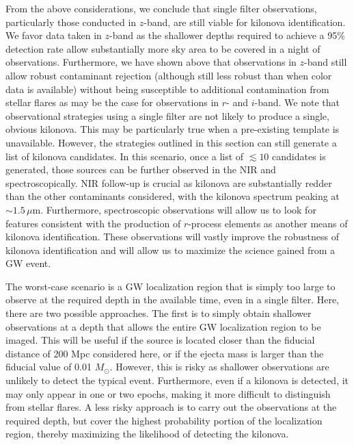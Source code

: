 From the above considerations, we conclude that single filter observations, particularly those conducted in $z$-band, are still viable for kilonova identification. We favor data taken in $z$-band as the shallower depths required to achieve a 95\% detection rate allow substantially more sky area to be covered in a night of observations.  Furthermore, we have shown above that observations in $z$-band still allow robust contaminant rejection (although still less robust than when color data is available) without being susceptible to additional contamination from stellar flares as may be the case for observations in $r$- and $i$-band. We note that observational strategies using a single filter are not likely to  produce a single, obvious kilonova. This may be particularly true when a pre-existing template is unavailable. However, the strategies outlined in this section can still generate a list of kilonova candidates. In this scenario, once a list of $\lesssim10$ candidates is generated, those sources can be further observed in the NIR and spectroscopically. NIR follow-up is crucial as kilonova are substantially redder than the other contaminants considered, with the kilonova spectrum peaking at $\sim1.5\,\mu$m. Furthermore, spectroscopic observations will allow us to look for features consistent with the production of $r$-process elements as another means of kilonova identification. These observations will vastly improve the robustness of kilonova identification and will allow us to maximize the science gained from a GW event.

The worst-case scenario is a GW localization region that is simply too large to observe at the required depth in the available time, even in a single filter. Here, there are two possible approaches. The first is to simply obtain shallower observations at a depth that allows the entire GW localization region to be imaged. This will be useful if the source is located closer than the fiducial distance of 200 Mpc considered here, or if the ejecta mass is larger than the fiducial value of 0.01 $M_{\odot}$. However, this is risky as shallower observations are unlikely to detect the typical event. Furthermore, even if a kilonova is detected, it may only appear in one or two epochs, making it more difficult to distinguish from stellar flares. A less risky approach is to carry out the observations at the required depth, but cover the highest probability portion of the localization region, thereby maximizing the likelihood of detecting the kilonova.

